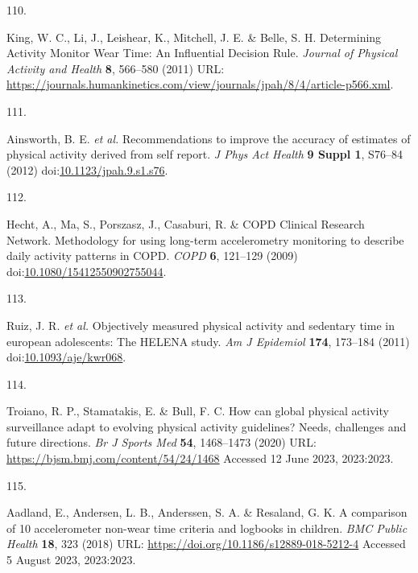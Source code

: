 \documentclass[
  10pt,
]{scrbook}
\newlength{\cslhangindent}
\newlength{\csllabelwidth}
\newlength{\cslentryspacingunit} %
\newenvironment{CSLReferences}[2] %
 {%
  \setlength{\parindent}{0pt}
  \ifodd #1
  \let\oldpar\par
  \def\par{\hangindent=\cslhangindent\oldpar}
  \fi
  \setlength{\parskip}{#2\cslentryspacingunit}
 }%
 {}
\newcommand{\CSLLeftMargin}[1]{\parbox[t]{\csllabelwidth}{#1}}
\newcommand{\CSLRightInline}[1]{\parbox[t]{\linewidth - \csllabelwidth}{#1}\break}
\let\originaltextbf\textbf
\renewcommand{\textbf}[1]{\textcolor{color1}{\textsf{\originaltextbf{#1}}}}
\begin{document}
\begin{CSLReferences}{0}{0}
\leavevmode{}%
\CSLLeftMargin{110. }%
\CSLRightInline{King, W. C., Li, J., Leishear, K., Mitchell, J. E. \&
Belle, S. H. Determining Activity Monitor Wear Time: An Influential
Decision Rule. \emph{Journal of Physical Activity and Health}
\textbf{8}, 566--580 (2011) URL:
\url{https://journals.humankinetics.com/view/journals/jpah/8/4/article-p566.xml}.}

\leavevmode{}%
\CSLLeftMargin{111. }%
\CSLRightInline{Ainsworth, B. E. \emph{et al.} Recommendations to
improve the accuracy of estimates of physical activity derived from self
report. \emph{J Phys Act Health} \textbf{9 Suppl 1}, S76--84 (2012)
doi:\href{https://doi.org/10.1123/jpah.9.s1.s76}{10.1123/jpah.9.s1.s76}.}

\leavevmode{}%
\CSLLeftMargin{112. }%
\CSLRightInline{Hecht, A., Ma, S., Porszasz, J., Casaburi, R. \& COPD
Clinical Research Network. Methodology for using long-term accelerometry
monitoring to describe daily activity patterns in {COPD}. \emph{{COPD}}
\textbf{6}, 121--129 (2009)
doi:\href{https://doi.org/10.1080/15412550902755044}{10.1080/15412550902755044}.}

\leavevmode{}%
\CSLLeftMargin{113. }%
\CSLRightInline{Ruiz, J. R. \emph{et al.} Objectively measured physical
activity and sedentary time in european adolescents: The {HELENA} study.
\emph{Am J Epidemiol} \textbf{174}, 173--184 (2011)
doi:\href{https://doi.org/10.1093/aje/kwr068}{10.1093/aje/kwr068}.}

\leavevmode{}%
\CSLLeftMargin{114. }%
\CSLRightInline{Troiano, R. P., Stamatakis, E. \& Bull, F. C. How can
global physical activity surveillance adapt to evolving physical
activity guidelines? Needs, challenges and future directions. \emph{Br J
Sports Med} \textbf{54}, 1468--1473 (2020) URL:
\url{https://bjsm.bmj.com/content/54/24/1468} Accessed 12 June 2023,
2023:2023.}

\leavevmode{}%
\CSLLeftMargin{115. }%
\CSLRightInline{Aadland, E., Andersen, L. B., Anderssen, S. A. \&
Resaland, G. K. A comparison of 10 accelerometer non-wear time criteria
and logbooks in children. \emph{{BMC} Public Health} \textbf{18}, 323
(2018) URL: \url{https://doi.org/10.1186/s12889-018-5212-4} Accessed 5
August 2023, 2023:2023.}


\end{CSLReferences}
\end{document}
